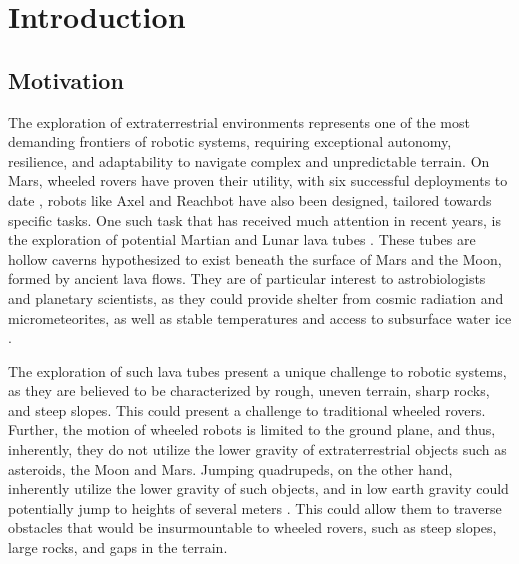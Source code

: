 \section{Introduction}

\subsection{Motivation}
\label{sec:motivation}


The exploration of extraterrestrial environments represents one of the most demanding frontiers of robotic systems, requiring exceptional autonomy, resilience, and adaptability to navigate complex and unpredictable terrain. On Mars, wheeled rovers have proven their utility, with six successful deployments to date \cite{mars_rovers_x6}, robots like Axel \cite{Axel} and Reachbot \cite{ReachBot} have also been designed, tailored towards specific tasks. One such task that has received much attention in recent years, is the exploration of potential Martian and Lunar lava tubes \cite{lavatubes}. These tubes are hollow caverns hypothesized to exist beneath the surface of Mars and the Moon, formed by ancient lava flows. They are of particular interest to astrobiologists and planetary scientists, as they could provide shelter from cosmic radiation and micrometeorites, as well as stable temperatures and access to subsurface water ice \cite{lavatubes}.

The exploration of such lava tubes present a unique challenge to robotic systems, as they are believed to be characterized by rough, uneven terrain, sharp rocks, and steep slopes. This could present a challenge to traditional wheeled rovers. Further, the motion of wheeled robots is limited to the ground plane, and thus, inherently, they do not utilize the lower gravity of extraterrestrial objects such as asteroids, the Moon and Mars. Jumping quadrupeds, on the other hand, inherently utilize the lower gravity of such objects, and in low earth gravity could potentially jump to heights of several meters \cite{OLYMPUS2}. This could allow them to traverse obstacles that would be insurmountable to wheeled rovers, such as steep slopes, large rocks, and gaps in the terrain.

